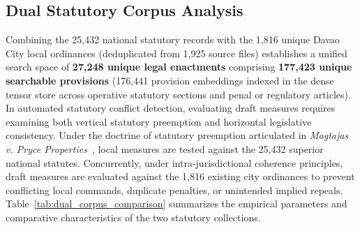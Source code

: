 \subsection{Dual Statutory Corpus Analysis}
\label{sec:results_dual_corpus_analysis}
Combining the 25,432 national statutory records with the 1,816 unique Davao City local ordinances (deduplicated from 1,925 source files) establishes a unified search space of \textbf{27,248 unique legal enactments} comprising \textbf{177,423 unique searchable provisions} (176,441 provision embeddings indexed in the dense tensor store across operative statutory sections and penal or regulatory articles). In automated statutory conflict detection, evaluating draft measures requires examining both vertical statutory preemption and horizontal legislative consistency. Under the doctrine of statutory preemption articulated in \textit{Magtajas v. Pryce Properties}~\cite{scp1994magtajasvpryce}, local measures are tested against the 25,432 superior national statutes. Concurrently, under intra-jurisdictional coherence principles, draft measures are evaluated against the 1,816 existing city ordinances to prevent conflicting local commands, duplicate penalties, or unintended implied repeals. Table~\ref{tab:dual_corpus_comparison} summarizes the empirical parameters and comparative characteristics of the two statutory collections.

